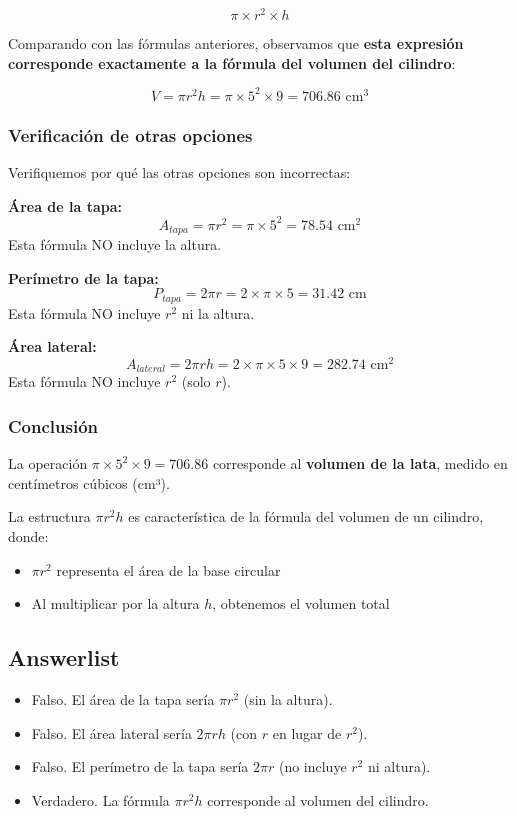 \documentclass[
]{article}
\providecommand{\tightlist}{%
  \setlength{\itemsep}{0pt}\setlength{\parskip}{0pt}}
\begin{document}
\[\pi \times r^2 \times h\]

Comparando con las fórmulas anteriores, observamos que \textbf{esta
expresión corresponde exactamente a la fórmula del volumen del
cilindro}:

\[V = \pi r^2 h = \pi \times 5^2 \times 9 = 706.86 \text{ cm}^3\]

\subsubsection{Verificación de otras
opciones}\label{verificaciuxf3n-de-otras-opciones}

Verifiquemos por qué las otras opciones son incorrectas:

\textbf{Área de la tapa:}
\[A_{tapa} = \pi r^2 = \pi \times  5 ^2 =  78.54  \text{ cm}^2\] Esta
fórmula NO incluye la altura.

\textbf{Perímetro de la tapa:}
\[P_{tapa} = 2\pi r = 2 \times \pi \times  5  =  31.42  \text{ cm}\]
Esta fórmula NO incluye \(r^2\) ni la altura.

\textbf{Área lateral:}
\[A_{lateral} = 2\pi r h = 2 \times \pi \times  5  \times  9  =  282.74  \text{ cm}^2\]
Esta fórmula NO incluye \(r^2\) (solo \(r\)).

\subsubsection{Conclusión}\label{conclusiuxf3n}

La operación \(\pi \times 5^2 \times 9 = 706.86\) corresponde al
\textbf{volumen de la lata}, medido en centímetros cúbicos (cm³).

La estructura \(\pi r^2 h\) es característica de la fórmula del volumen
de un cilindro, donde:

\begin{itemize}
\tightlist
\item
  \(\pi r^2\) representa el área de la base circular
\item
  Al multiplicar por la altura \(h\), obtenemos el volumen total
\end{itemize}

\subsection{Answerlist}\label{answerlist-1}

\begin{itemize}
\tightlist
\item
  Falso. El área de la tapa sería \(\pi r^2\) (sin la altura).
\item
  Falso. El área lateral sería \(2\pi r h\) (con \(r\) en lugar de
  \(r^2\)).
\item
  Falso. El perímetro de la tapa sería \(2\pi r\) (no incluye \(r^2\) ni
  altura).
\item
  Verdadero. La fórmula \(\pi r^2 h\) corresponde al volumen del
  cilindro.
\end{itemize}
\end{document}
